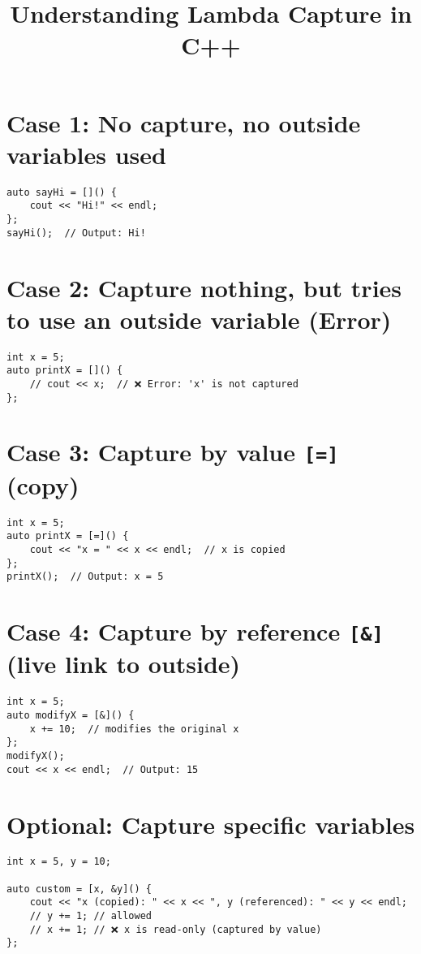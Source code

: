 \documentclass[12pt]{article}
\title{Understanding Lambda Capture in C++}
\author{}
\date{}
\begin{document}
\maketitle
\tableofcontents
\newpage

\section*{Case 1: No capture, no outside variables used}
\begin{verbatim}
auto sayHi = []() {
    cout << "Hi!" << endl;
};
sayHi();  // Output: Hi!
\end{verbatim}

\section*{Case 2: Capture nothing, but tries to use an outside variable (Error)}
\begin{verbatim}
int x = 5;
auto printX = []() {
    // cout << x;  // ❌ Error: 'x' is not captured
};
\end{verbatim}

\section*{Case 3: Capture by value \texttt{[=]} (copy)}
\begin{verbatim}
int x = 5;
auto printX = [=]() {
    cout << "x = " << x << endl;  // x is copied
};
printX();  // Output: x = 5
\end{verbatim}

\section*{Case 4: Capture by reference \texttt{[&]} (live link to outside)}
\begin{verbatim}
int x = 5;
auto modifyX = [&]() {
    x += 10;  // modifies the original x
};
modifyX();
cout << x << endl;  // Output: 15
\end{verbatim}

\section*{Optional: Capture specific variables}
\begin{verbatim}
int x = 5, y = 10;

auto custom = [x, &y]() {
    cout << "x (copied): " << x << ", y (referenced): " << y << endl;
    // y += 1; // allowed
    // x += 1; // ❌ x is read-only (captured by value)
};
\end{verbatim}
\end{document}
